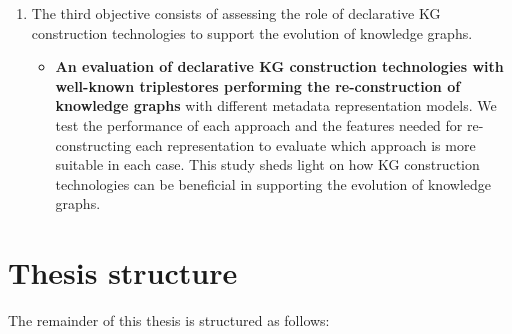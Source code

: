 \begin{enumerate}
    \item The third objective consists of assessing the role of declarative KG construction technologies to support the evolution of knowledge graphs.

    \begin{itemize}
        \item \textbf{An evaluation of declarative KG construction technologies with well-known triplestores performing the re-construction of knowledge graphs} with different metadata representation models. We test the performance of each approach and the features needed for re-constructing each representation to evaluate which approach is more suitable in each case. This study sheds light on how KG construction technologies can be beneficial in supporting the evolution of knowledge graphs.
    \end{itemize}
\end{enumerate}


\section{Thesis structure}

The remainder of this thesis is structured as follows:

